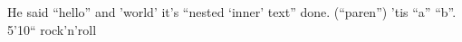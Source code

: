 \documentclass[11pt]{article}
\author{Au}
\date{2026-01-01}
\title{}
\begin{document}
\tableofcontents

He said ``hello'' and 'world' it's ``nested `inner' text'' done. (``paren'') 'tis ``a'' ``b''. 5'10`` rock'n'roll
\end{document}

